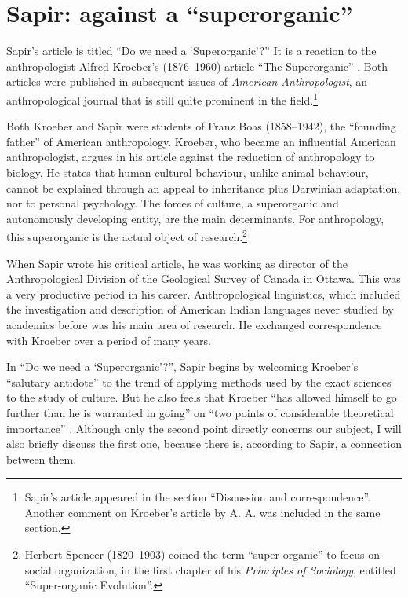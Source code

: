 \documentclass[output=paper]{langscibook}
\begin{document}
\section{Sapir: against a ``superorganic''}
\label{sec:elffers:superorganic}

Sapir's \citeyear{Sapir1917} article is titled ``Do we need a `Superorganic'?'' It is a reaction to the anthropologist Alfred Kroeber's (1876--1960) article ``The Superorganic'' \citep{Kroeber1917}. Both articles were published in subsequent issues of \emph{American Anthropologist}, an anthropological journal that is still quite prominent in the field.\footnote{Sapir's article appeared in the section ``Discussion and correspondence''. Another comment on Kroeber's article by A. A. \citet{Goldenweiser1917} was included in the same section.}

Both Kroeber and Sapir were students of Franz Boas (1858--1942), the ``founding father'' of American anthropology. Kroeber, who became an influential American anthropologist, argues in his \citeyear{Kroeber1917} article against the reduction of anthropology to biology. He states that human cultural behaviour, unlike animal behaviour, cannot be explained through an appeal to inheritance plus Darwinian adaptation, nor to personal psychology. The forces of culture, a superorganic and autonomously developing entity, are the main determinants. For anthropology, this superorganic is the actual object of research.\footnote{Herbert Spencer (1820--1903) coined the term ``super-organic'' to focus on social organization, in the first chapter of his \citeyear{Spencer1898} \emph{Principles of Sociology}, entitled ``Super-organic Evolution''.}

When Sapir wrote his critical article, he was working as director of the Anthropological Division of the Geological Survey of Canada in Ottawa. This was a very productive period in his career. Anthropological linguistics, which included the investigation and description of American Indian languages never studied by academics before was his main area of research. He exchanged correspondence with Kroeber over a period of many years.

In ``Do we need a `Superorganic'?'', Sapir begins by welcoming Kroeber's ``salutary antidote'' to the trend of applying methods used by the exact sciences to the study of culture. But he also feels that Kroeber ``has allowed himself to go further than he is warranted in going'' on ``two points of considerable theoretical importance'' \citep[441]{Sapir1917}. Although only the second point directly concerns our subject, I will also briefly discuss the first one, because there is, according to Sapir, a connection between them.
\end{document}
